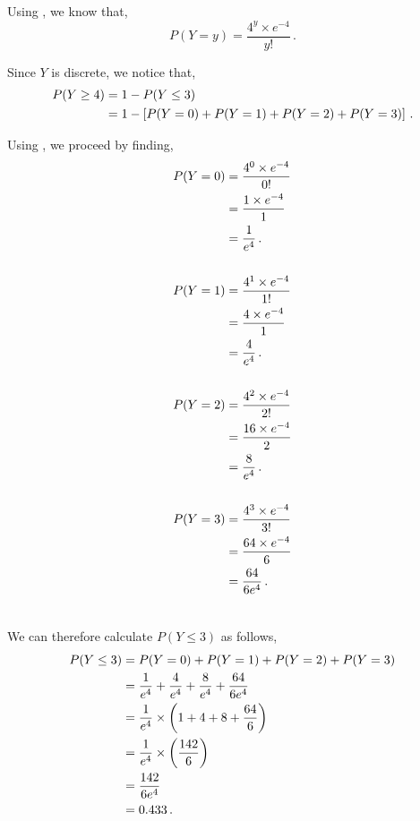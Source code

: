 \begin{subquestions}
\begin{subsubquestions}
Using , we know that,
\begin{equation}
	P(Y=y)= \frac{4^y \times e^{-4}}{y!} \,. \label{2013:q4:eq:Pois1}
\end{equation}

Since $Y$ is discrete, we notice that,
\begin{align}
	P(Y \geq 4) & = 1 - P(Y \leq 3) \nonumber \\
	            & = 1 - \left[P(Y=0)+P(Y=1)+P(Y=2)+P(Y=3) \right] \,.
\end{align}

Using , we proceed by finding,
\begin{align}
	P(Y=0) & = \frac{4^0 \times e^{-4}}{0!} \nonumber \\
	& = \frac{1 \times e^{-4}}{1} \nonumber \\
	& = \frac{1}{e^4} \,. \\	\nonumber \\
	P(Y=1) & = \frac{4^1 \times e^{-4}}{1!} \nonumber \\
	& = \frac{4 \times e^{-4}}{1} \nonumber \\
	& = \frac{4}{e^4} \,. \\	\nonumber \\       
	P(Y=2) & = \frac{4^2 \times e^{-4}}{2!} \nonumber \\
	& = \frac{16 \times e^{-4}}{2} \nonumber \\
	& = \frac{8}{e^4} \,. \\ \nonumber \\            
	P(Y=3) & = \frac{4^3 \times e^{-4}}{3!} \nonumber \\
	& = \frac{64 \times e^{-4}}{6} \nonumber \\
	& = \frac{64}{6e^4} \,. \\ \nonumber \\
\end{align}


We can therefore calculate $P(Y \leq 3)$ as follows,
\begin{align}         
    P(Y \leq 3) & = P(Y=0)+P(Y=1)+P(Y=2)+P(Y=3) \nonumber \\
                & = \frac{1}{e^4} + \frac{4}{e^4} + \frac{8}{e^4} + \frac{64}{6e^4} \nonumber \\
                & = \frac{1}{e^4} \times \left(1+4+8+\frac{64}{6} \right) \nonumber \\
                & = \frac{1}{e^4} \times \left(\frac{142}{6} \right) \nonumber \\
                & = \frac{142}{6e^4} \nonumber \\
                & = 0.433 \,.
\end{align}


\end{subsubquestions}
\end{subquestions}
